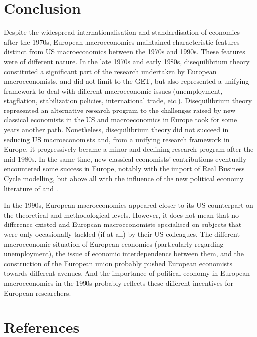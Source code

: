 \documentclass[]{elsarticle} %
\begin{document}
\hypertarget{conclusion}{%
\section*{Conclusion}\label{conclusion}}

Despite the widespread internationalisation and standardisation of
economics after the 1970s, European macroeconomics maintained
characteristic features distinct from US macroeconomics between the
1970s and 1990s. These features were of different nature. In the late
1970s and early 1980s, disequilibrium theory constituted a significant
part of the research undertaken by European macroeconomists, and did not
limit to the GET, but also represented a unifying framework to deal with
different macroeconomic issues (unemployment, stagflation, stabilization
policies, international trade, etc.). Disequilibrium theory represented
an alternative research program to the challenges raised by new
classical economists in the US and macroeconomics in Europe took for
some years another path. Nonetheless, disequilibrium theory did not
succeed in seducing US macroeconomists and, from a unifying research
framework in Europe, it progressively became a minor and declining
research program after the mid-1980s. In the same time, new classical
economists' contributions eventually encountered some success in Europe,
notably with the import of Real Business Cycle modelling, but above all
with the influence of the new political economy literature of
\citet{kydland1977} and \citeauthor{barro1983}
\citetext{\citeyear{barro1983}; \citealp{barro1983c}}.

In the 1990s, European macroeconomics appeared closer to its US
counterpart on the theoretical and methodological levels. However, it
does not mean that no difference existed and European macroeconomists
specialised on subjects that were only occasionally tackled (if at all)
by their US colleagues. The different macroeconomic situation of
European economies (particularly regarding unemployment), the issue of
economic interdependence between them, and the construction of the
European union probably pushed European economists towards different
avenues. And the importance of political economy in European
macroeconomics in the 1990s probably reflects these different incentives
for European researchers.

\newpage

\hypertarget{references}{%
\section*{References}\label{references}}
\end{document}
